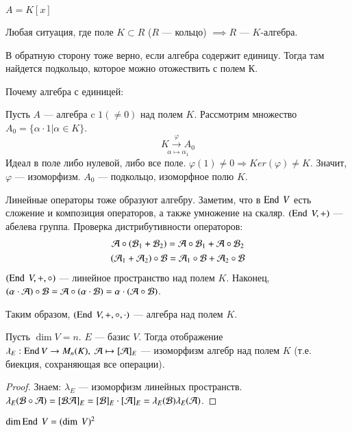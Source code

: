 \documentclass[main]{subfiles}
\begin{document}
\begin{example}
    $A = K[x]$
\end{example}
\begin{example}
    Любая ситуация, где поле $K \subset R$ ($R$ —  кольцо) $\implies R$ — $K$-алгебра.

    В обратную сторону тоже верно, если алгебра содержит единицу. Тогда там найдется подкольцо, которое можно отожествить с полем К.

    Почему алгебра с единицей:

    Пусть $A$ —  алгебра c $1(\neq0)$ над полем $K$.
    Рассмотрим множество $A_0 = \{\alpha \cdot 1| \alpha \in K\}$.
     \[\underset{\alpha \mapsto \alpha_1}{K \xrightarrow{\varphi} A_0 }\]
    Идеал в  поле либо нулевой, либо все поле.
    $\varphi(1) \neq 0 \Rightarrow Ker(\varphi)\neq K$.
    Значит,  $\varphi$ — изоморфизм. $A_0$ — подкольцо, изоморфное полю $K$.
\end{example}


Линейные операторы тоже образуют алгебру. Заметим, что в $\operatorname{End} \ V$ есть сложение и композиция операторов, а также умножение на скаляр.
$(\operatorname{End} \ V, +)$ — абелева группа. Проверка дистрибутивности операторов:
\begin{gather*}
    \mathcal{A}\circ(\mathcal{B}_1+\mathcal{B}_2) = \mathcal{A}\circ\mathcal{B}_1 + \mathcal{A}\circ\mathcal{B}_2 \\
    (\mathcal{A}_1 + \mathcal{A}_2)\circ\mathcal{B} = \mathcal{A}_1\circ\mathcal{B}+\mathcal{A}_2\circ\mathcal{B}
\end{gather*}
$(\operatorname{End} \ V, +, \circ)$ — линейное пространство над полем $K$. Наконец,
$(\alpha\cdot\mathcal{A})\circ\mathcal{B}=\mathcal{A}\circ(\alpha\cdot\mathcal{B})=\alpha\cdot(\mathcal{A}\circ\mathcal{B})$.

Таким образом, $(\operatorname{End} \ V, +, \circ, \cdot)$ — алгебра над полем $K$.




\begin{proposition}
    Пусть $\dim V = n$. $E$ — базис $V$.
    Тогда отображение $\lambda_E : \operatorname{End} V \rightarrow M_n(K), \ \mathcal{A} \mapsto [\mathcal{A}]_E$ — изоморфизм алгебр над полем $K$ (т.е. биекция, сохраняющая все операции).
\end{proposition}

\begin{proof}
    Знаем: $\lambda_E$ — изоморфизм линейных пространств. $\lambda_E(\mathcal{B}\circ\mathcal{A})=[\mathcal{B}\mathcal{A}]_E=[\mathcal{B}]_E\cdot[\mathcal{A}]_E = \lambda_E(\mathcal{B})\lambda_E(\mathcal{A})$.
\end{proof}

\begin{corollary}
    $\dim \operatorname{End}\ V = (\dim \ V)^2 $
\end{corollary}
\end{document}
